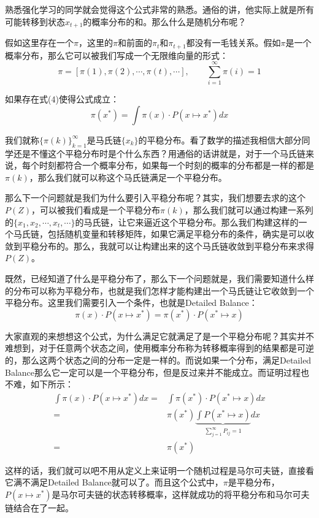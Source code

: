 \documentclass[a4paper]{article}
\begin{document}
熟悉强化学习的同学就会觉得这个公式非常的熟悉。通俗的讲，他实际上就是所有可能转移到状态$x_{t+1}$的概率分布的和。那么什么是随机分布呢？

假如这里存在一个$\pi$，这里的$\pi$和前面的$\pi_{t}$和$\pi_{t+1}$都没有一毛钱关系。假如$\pi$是一个概率分布，那么它可以被我们写成一个无限维向量的形式：
\begin{equation}
    \pi = [\pi(1),\pi(2),\cdots,\pi(t),\cdots], \qquad \sum_{i=1}^\infty \pi(i) = 1
\end{equation}

如果存在式(4)使得公式成立：
\begin{equation}
    \pi(x^\ast) = \int \pi(x)\cdot P(x\mapsto x^\ast) dx
\end{equation}

我们就称$\{ \pi(k) \}_{k=1}^\infty $是马氏链$\{x_{k}\}$的平稳分布。看了数学的描述我相信大部分同学还是不懂这个平稳分布时是个什么东西？用通俗的话讲就是，对于一个马氏链来说，每个时刻都符合一个概率分布，如果每一个时刻的概率的分布都是一样的都是$\pi(k)$，那么我们就可以称这个马氏链满足一个平稳分布。

那么下一个问题就是我们为什么要引入平稳分布呢？其实，我们想要去求的这个$P(Z)$，可以被我们看成是一个平稳分布$\pi(k)$，那么我们就可以通过构建一系列的$\{ x_1,x_2,\cdots,x_t,\cdots \}$的马氏链，让它来逼近这个平稳分布。那么我们构建这样的一个马氏链，包括随机变量和转移矩阵，如果它满足平稳分布的条件，确实是可以收敛到平稳分布的。那么，我就可以让构建出来的这个马氏链收敛到平稳分布来求得$P(Z)$。

既然，已经知道了什么是平稳分布了，那么下一个问题就是，我们需要知道什么样的分布可以称为平稳分布，也就是我们怎样才能构建出一个马氏链让它收敛到一个平稳分布。这里我们需要引入一个条件，也就是Detailed Balance：
\begin{equation}
    \pi(x)\cdot P(x\mapsto x^\ast) = \pi(x^\ast)\cdot P(x^\ast \mapsto x)
\end{equation}

大家直观的来想想这个公式，为什么满足它就满足了是一个平稳分布呢？其实并不难想到，对于任意两个状态之间，使用概率分布称为转移概率得到的结果都是可逆的，那么这两个状态之间的分布一定是一样的。而说如果一个分布，满足Detailed Balance那么它一定可以是一个平稳分布，但是反过来并不能成立。而证明过程也不难，如下所示：
\begin{equation}
    \begin{split}
        \int \pi(x)\cdot P(x\mapsto x^\ast)dx 
        = & \int \pi(x^\ast)\cdot P(x^\ast \mapsto x) dx \\ 
        = & \pi(x^\ast) \underbrace{\int P(x^\ast \mapsto x)}_{\sum_{j=1}^\infty P_{ij} = 1 } dx \\
        = & \pi(x^\ast)
    \end{split}
\end{equation}

这样的话，我们就可以吧不用从定义上来证明一个随机过程是马尔可夫链，直接看它满不满足Detailed Balance就可以了。而且这个公式中，$\pi$是平稳分布，$P(x\mapsto x^\ast)$是马尔可夫链的状态转移概率，这样就成功的将平稳分布和马尔可夫链结合在了一起。
\end{document}
